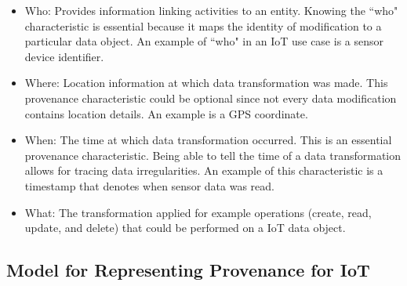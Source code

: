 \documentclass[conference]{IEEEtran}
\begin{document}
\begin{itemize}

\item Who: Provides information linking activities to an entity. Knowing the ``who" characteristic is essential because it maps the identity of modification to a particular data object. An example of ``who" in an IoT use case is a sensor device identifier.

\item Where: Location information at which data transformation was made. This provenance characteristic could be optional since not every data modification contains location details. An example is a GPS coordinate.

\item When: The time at which data transformation occurred. This is an essential provenance characteristic. Being able to tell the time of a data transformation allows for tracing data irregularities. An example of this characteristic is a timestamp that denotes when sensor data was read.

\item What: The transformation applied for example operations (create, read, update, and delete) that could be performed on a IoT data object.

\end{itemize}



%


\subsection{Model for Representing Provenance for IoT}
\end{document}
